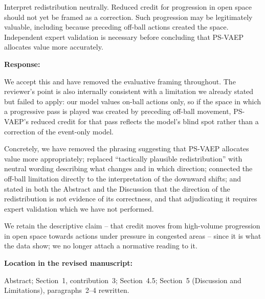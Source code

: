 \documentclass[11pt,a4paper]{article}
\newcommand{\response}[2]{%
  \begin{responsebox}
  \textbf{Response:}

  #1
  \end{responsebox}
  \begin{locationbox}
  \textbf{Location in the revised manuscript:}

  #2
  \end{locationbox}
}
\begin{document}
\begin{reviewbox}[Comment 7]
Interpret redistribution neutrally. Reduced credit for progression in open space should not yet be framed as a correction. Such progression may be legitimately valuable, including because preceding off-ball actions created the space. Independent expert validation is necessary before concluding that PS-VAEP allocates value more accurately.
\end{reviewbox}
\response{We accept this and have removed the evaluative framing throughout. The reviewer's point is also internally consistent with a limitation we already stated but failed to apply: our model values on-ball actions only, so if the space in which a progressive pass is played was created by preceding off-ball movement, PS-VAEP's reduced credit for that pass reflects the model's blind spot rather than a correction of the event-only model.

Concretely, we have removed the phrasing suggesting that PS-VAEP allocates value more appropriately; replaced ``tactically plausible redistribution'' with neutral wording describing what changes and in which direction; connected the off-ball limitation directly to the interpretation of the downward shifts; and stated in both the Abstract and the Discussion that the direction of the redistribution is not evidence of its correctness, and that adjudicating it requires expert validation which we have not performed.

We retain the descriptive claim -- that credit moves from high-volume progression in open space towards actions under pressure in congested areas -- since it is what the data show; we no longer attach a normative reading to it.}{Abstract; Section~1, contribution~3; Section~4.5; Section~5 (Discussion and Limitations), paragraphs~2--4 rewritten.}
\end{document}
